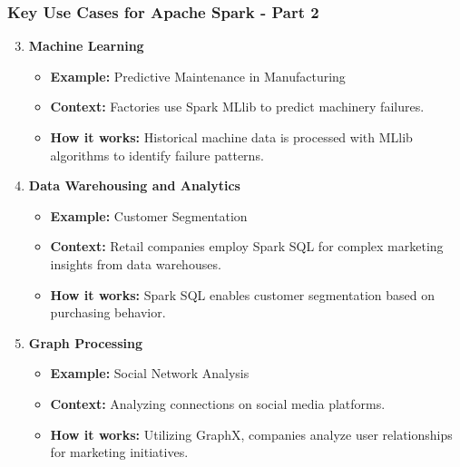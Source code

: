 \documentclass[aspectratio=169]{beamer}
\begin{document}
\begin{frame}
    \frametitle{Key Use Cases for Apache Spark - Part 2}
    \begin{enumerate}
        \setcounter{enumi}{2} %
        \item \textbf{Machine Learning}
            \begin{itemize}
                \item \textbf{Example:} Predictive Maintenance in Manufacturing
                \item \textbf{Context:} Factories use Spark MLlib to predict machinery failures.
                \item \textbf{How it works:} Historical machine data is processed with MLlib algorithms to identify failure patterns.
            \end{itemize}

        \item \textbf{Data Warehousing and Analytics}
            \begin{itemize}
                \item \textbf{Example:} Customer Segmentation
                \item \textbf{Context:} Retail companies employ Spark SQL for complex marketing insights from data warehouses.
                \item \textbf{How it works:} Spark SQL enables customer segmentation based on purchasing behavior.
            \end{itemize}

        \item \textbf{Graph Processing}
            \begin{itemize}
                \item \textbf{Example:} Social Network Analysis
                \item \textbf{Context:} Analyzing connections on social media platforms.
                \item \textbf{How it works:} Utilizing GraphX, companies analyze user relationships for marketing initiatives.
            \end{itemize}
    \end{enumerate}
\end{frame}
\end{document}
